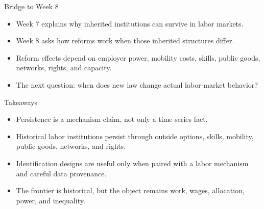 \documentclass[aspectratio=169,11pt]{beamer}
\begin{document}
\begin{frame}{Bridge to Week 8}
\begin{itemize}
    \item Week 7 explains why inherited institutions can survive in labor markets.
    \item Week 8 asks how reforms work when those inherited structures differ.
    \item Reform effects depend on employer power, mobility costs, skills, public goods, networks, rights, and capacity.
    \item The next question: when does new law change actual labor-market behavior?
\end{itemize}
\end{frame}

\begin{frame}{Takeaways}
\begin{itemize}
    \item Persistence is a mechanism claim, not only a time-series fact.
    \item Historical labor institutions persist through outside options, skills, mobility, public goods, networks, and rights.
    \item Identification designs are useful only when paired with a labor mechanism and careful data provenance.
    \item The frontier is historical, but the object remains work, wages, allocation, power, and inequality.
\end{itemize}
\end{frame}
\end{document}

